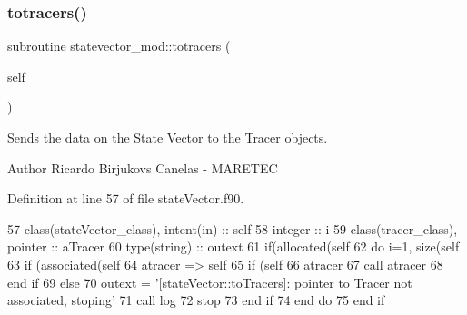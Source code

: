 \subsubsection{\texorpdfstring{totracers()}{totracers()}}
{\footnotesize\ttfamily subroutine statevector\+\_\+mod\+::totracers (\begin{DoxyParamCaption}\item[{class(\mbox{\hyperlink{structstatevector__mod_1_1statevector__class}{statevector\+\_\+class}}), intent(in)}]{self }\end{DoxyParamCaption})\hspace{0.3cm}{\ttfamily [private]}}



Sends the data on the State Vector to the Tracer objects. 

\begin{DoxyAuthor}{Author}
Ricardo Birjukovs Canelas -\/ M\+A\+R\+E\+T\+EC 
\end{DoxyAuthor}


Definition at line 57 of file state\+Vector.\+f90.


\begin{DoxyCode}
57     \textcolor{keywordtype}{class}(stateVector\_class), \textcolor{keywordtype}{intent(in)} :: self
58     \textcolor{keywordtype}{integer} :: i
59     \textcolor{keywordtype}{class}(tracer\_class), \textcolor{keywordtype}{pointer} :: aTracer
60     \textcolor{keywordtype}{type}(string) :: outext
61     \textcolor{keywordflow}{if}(\textcolor{keyword}{allocated}(self%
62         \textcolor{keywordflow}{do} i=1, \textcolor{keyword}{size}(self%
63             \textcolor{keywordflow}{if} (\textcolor{keyword}{associated}(self%
64                 atracer => self%
65                 \textcolor{keywordflow}{if} (self%
66                     atracer%
67                     \textcolor{keyword}{call }atracer%
68 \textcolor{keywordflow}{                end if}
69             \textcolor{keywordflow}{else}
70                 outext = \textcolor{stringliteral}{'[stateVector::toTracers]: pointer to Tracer not associated, stoping'}
71                 \textcolor{keyword}{call }log%
72                 stop
73 \textcolor{keywordflow}{            end if}
74 \textcolor{keywordflow}{        end do}
75 \textcolor{keywordflow}{    end if}
\end{DoxyCode}
